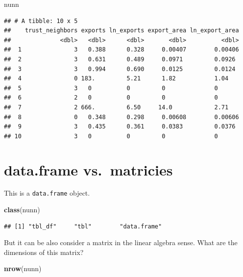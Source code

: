 \documentclass[
]{book}
\newenvironment{Shaded}{\begin{snugshade}}{\end{snugshade}}
\newcommand{\KeywordTok}[1]{\textcolor[rgb]{0.13,0.29,0.53}{\textbf{#1}}}
\newcommand{\NormalTok}[1]{#1}
\theoremstyle{definition}
\theoremstyle{definition}
\theoremstyle{definition}
\theoremstyle{remark}
\begin{document}
\begin{Shaded}
\begin{Highlighting}[]
\NormalTok{nunn}
\end{Highlighting}
\end{Shaded}

\begin{verbatim}
## # A tibble: 10 x 5
##    trust_neighbors exports ln_exports export_area ln_export_area
##              <dbl>   <dbl>      <dbl>       <dbl>          <dbl>
##  1               3   0.388      0.328     0.00407        0.00406
##  2               3   0.631      0.489     0.0971         0.0926 
##  3               3   0.994      0.690     0.0125         0.0124 
##  4               0 183.         5.21      1.82           1.04   
##  5               3   0          0         0              0      
##  6               2   0          0         0              0      
##  7               2 666.         6.50     14.0            2.71   
##  8               0   0.348      0.298     0.00608        0.00606
##  9               3   0.435      0.361     0.0383         0.0376 
## 10               3   0          0         0              0
\end{verbatim}

\hypertarget{data.frame-vs.-matricies}{%
\section{data.frame vs.~matricies}\label{data.frame-vs.-matricies}}

This is a \texttt{data.frame} object.

\begin{Shaded}
\begin{Highlighting}[]
\KeywordTok{class}\NormalTok{(nunn)}
\end{Highlighting}
\end{Shaded}

\begin{verbatim}
## [1] "tbl_df"     "tbl"        "data.frame"
\end{verbatim}

But it can be also consider a matrix in the linear algebra sense. What are the dimensions of this matrix?

\begin{Shaded}
\begin{Highlighting}[]
\KeywordTok{nrow}\NormalTok{(nunn)}
\end{Highlighting}
\end{Shaded}
\end{document}
